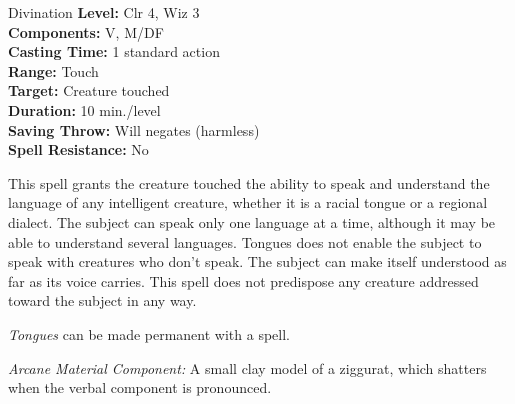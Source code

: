 {Divination}
{
	\textbf{Level:}
	Clr 4, Wiz 3\\
	\textbf{Components:}
	V, M/DF\\
	\textbf{Casting Time:}
	1 standard action\\
	\textbf{Range:}
	Touch\\
	\textbf{Target:}
	Creature touched\\
	\textbf{Duration:}
	10 min./level\\
	\textbf{Saving Throw:}
	Will negates (harmless)\\
	\textbf{Spell Resistance:}
	No\\
}
{
	This spell grants the creature touched the ability to speak and understand the language of any intelligent creature, whether it is a racial tongue or a regional dialect. The subject can speak only one language at a time, although it may be able to understand several languages. Tongues does not enable the subject to speak with creatures who don't speak. The subject can make itself understood as far as its voice carries. This spell does not predispose any creature addressed toward the subject in any way.

	\emph{Tongues} can be made permanent with a  spell.

	\textit{Arcane Material Component:}
	A small clay model of a ziggurat, which shatters when the verbal component is pronounced.

}
